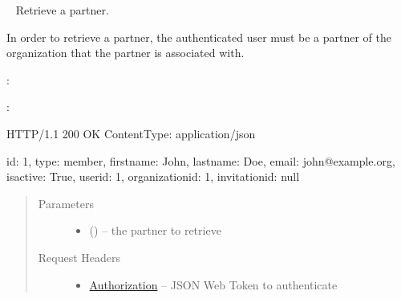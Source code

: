 \documentclass[letterpaper,10pt,english]{sphinxmanual}
\begin{document}
\begin{fulllineitems}
\label{\detokenize{resources/partner:get--partners-(partner_id)}}~
Retrieve a partner.

In order to retrieve a partner, the authenticated user must be a
partner of the organization that the partner is associated with.

:

\begin{sphinxVerbatim}[commandchars=\\\{\}]
  
 
 
\end{sphinxVerbatim}

:

\begin{sphinxVerbatim}[commandchars=\\\{\}]
HTTP/1.1 200 OK
Content\PYGZhy{}Type: application/json

\PYGZob{}
    \PYGZsq{}id\PYGZsq{}: 1,
    \PYGZsq{}type\PYGZsq{}: \PYGZsq{}member\PYGZsq{},
    \PYGZsq{}firstname\PYGZsq{}: \PYGZsq{}John\PYGZsq{},
    \PYGZsq{}lastname\PYGZsq{}: \PYGZsq{}Doe\PYGZsq{},
    \PYGZsq{}email\PYGZsq{}: \PYGZsq{}john@example.org\PYGZsq{},
    \PYGZsq{}is\PYGZus{}active\PYGZsq{}: True,
    \PYGZsq{}user\PYGZus{}id\PYGZsq{}: 1,
    \PYGZsq{}organization\PYGZus{}id\PYGZsq{}: 1,
    \PYGZsq{}invitation\PYGZus{}id\PYGZsq{}: null
\PYGZcb{}
\end{sphinxVerbatim}
\begin{quote}\begin{description}
\item[{Parameters}] \leavevmode\begin{itemize}
\item {} 
 () -- the partner to retrieve

\end{itemize}

\item[{Request Headers}] \leavevmode\begin{itemize}
\item {} 
\href{http://tools.ietf.org/html/rfc7235\#section-4.2}{Authorization} -- JSON Web Token to authenticate


\end{itemize}
\end{description}
\end{quote}
\end{fulllineitems}
\end{document}
